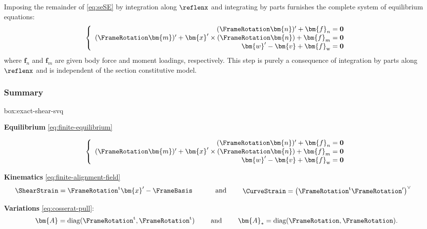 Imposing the remainder of \eqref{eq:seSE} by integration along \(\reflenx\) and integrating by parts furnishes the complete system of equilibrium equations:
\begin{equation} 
\left\{\begin{array}{r}
(\FrameRotation \bm{n})^{\prime}+{\bm{f}}_n=\mathbf{0} \\
(\FrameRotation \bm{m})^{\prime}+\bm{x}^{\prime} \times (\FrameRotation \bm{n}) +{\bm{f}}_m=\mathbf{0} \\
\bm{w}^{\prime}-\bm{v} + \bm{f}_{\rm w} = \mathbf{0}
\end{array}\right. 
\label{eq:finite-equilibrium}
\end{equation}
where \(\bm{f}_n\) and \(\bm{f}_m\) are given body force and moment loadings, respectively. 
This step is purely a consequence of integration by parts along \(\reflenx\) and is independent of the section constitutive model.


\subsubsection{Summary}

\begin{ambox}{box:exact-shear-svq}

\textbf{Equilibrium} \eqref{eq:finite-equilibrium}

\begin{equation*} 
\left\{\begin{array}{r}
(\FrameRotation \bm{n})^{\prime}+{\bm{f}}_n=\mathbf{0} \\
(\FrameRotation \bm{m})^{\prime}+\bm{x}^{\prime} \times (\FrameRotation \bm{n}) +{\bm{f}}_m=\mathbf{0} \\
\bm{w}^{\prime}-\bm{v} + \bm{f}_{\rm w} = \mathbf{0}
\end{array}\right. 
\end{equation*}

\textbf{Kinematics} \eqref{eq:finite-alignment-field}
\begin{equation*} 
  \begin{aligned}
    \ShearStrain &= \FrameRotation^\mathrm{t}\bm{x}^\prime - \FrameBasis 
  \end{aligned}
  \qquad\text{ and }\qquad
  \begin{aligned}
    \CurveStrain &= 
    \left(\FrameRotation^\mathrm{t}\FrameRotation^\prime\right)^{\vee}
  \end{aligned}
\end{equation*}

\textbf{Variations}
\eqref{eq:cosserat-pull}:
\begin{equation*}
\bm{A} = \operatorname{diag}(\FrameRotation^{\mathrm{t}}, \FrameRotation^{\mathrm{t}})
\qquad\text{ and }\qquad
\bm{A}_* = \operatorname{diag}(\FrameRotation, \FrameRotation).
\end{equation*}
\end{ambox}


